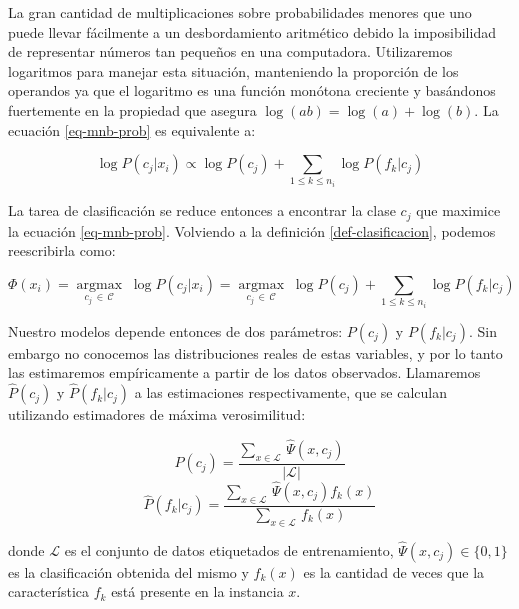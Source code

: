 La gran cantidad de multiplicaciones sobre probabilidades menores que uno puede llevar fácilmente a un desbordamiento aritmético debido la imposibilidad de representar números tan pequeños en una computadora. Utilizaremos logaritmos para manejar esta situación, manteniendo la proporción de los operandos ya que el logaritmo es una función monótona creciente y basándonos fuertemente en la propiedad que asegura $\log(ab) = \log(a) + \log(b)$. La ecuación \ref{eq-mnb-prob} es equivalente a:

\begin{equation}
\log P(c_j|x_i) \propto \log P(c_j) + \sum_{1\leq k \leq n_i} \log P(f_k|c_j)
\end{equation}

La tarea de clasificación se reduce entonces a encontrar la clase $c_j$ que maximice la ecuación \ref{eq-mnb-prob}. Volviendo a la definición \ref{def-clasificacion}, podemos reescribirla como:

\begin{definition}
\begin{equation}
    \Phi(x_i) = \operatorname*{argmax}_{c_j \, \in \, \mathcal{C}} \; \log P(c_j|x_i) = \operatorname*{argmax}_{c_j \, \in \, \mathcal{C}} \; \log P(c_j) + \sum_{1\leq k \leq n_i} \log P(f_k|c_j)
\end{equation}
\end{definition}

Nuestro modelos depende entonces de dos parámetros: $P(c_j)$ y $P(f_k|c_j)$. Sin embargo no conocemos las distribuciones reales de estas variables, y por lo tanto las estimaremos empíricamente a partir de los datos observados. Llamaremos $\hat{P}(c_j)$ y $\hat{P}(f_k|c_j)$ a las estimaciones respectivamente, que se calculan utilizando estimadores de máxima verosimilitud:

\begin{equation}
\hat{P}(c_j) = \frac{\sum_{x \in \mathcal{L}} \, \hat{\Psi}(x, c_j)}{|\mathcal{L}|}
\end{equation}
\begin{equation}\label{sin-smooth}
\hat{P}(f_k|c_j) = \frac{\sum_{x \in \mathcal{L}} \, \hat{\Psi}(x, c_j) f_k(x)}{\sum_{x \in \mathcal{L}} \, f_k(x)}
\end{equation}

donde $\mathcal{L}$ es el conjunto de datos etiquetados de entrenamiento, $\hat{\Psi}(x, c_j) \in \{0,1\}$ es la clasificación obtenida del mismo y $f_k(x)$ es la cantidad de veces que la característica $f_k$ está presente en la instancia $x$.

